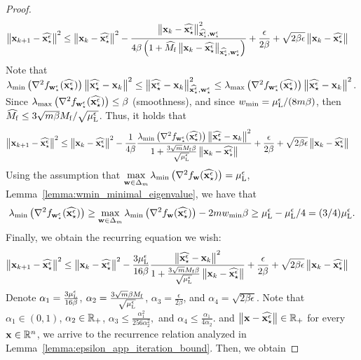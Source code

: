 \begin{proof}
\begin{align*}
    \enorm{\x_{k+1}-\widehat{\xse}}^2 & \leq \enorm{\x_k-\widehat{\xse}}^2 -  \frac{\enorm{\x_k - \widehat{\xse}}_{ \widehat{\xse},\wse}^2}{4\beta \brac{1+\widehat{M_{\mathrm{f}}} \enorm{\x_k-\widehat{\xse}}_{\widehat{\xse}, \wse}}} + \frac{ \epsilon}{2\beta} + \sqrt{2 \beta \epsilon} \enorm{\x_k - \widehat{\xse}}
\end{align*}
Note that $\lambda_{\min} \brac{\nabla^2 f_{\wse}(\widehat{\xse})} \enorm{\widehat{\xse} - \x_k}^2 \leq \enorm{\widehat{\xse} - \x_k}_{\widehat{\xse},\wse}^2 \leq \lambda_{\max} \brac{\nabla^2 f_{\wse}(\widehat{\xse})} \enorm{\widehat{\xse} - \x_k}^2$. Since $\lambda_{\max} \brac{\nabla^2 f_{\wse}(\widehat{\xse})} \leq \beta$ (smoothness), and since $w_{\min}= \mulocaleps /(8m\beta)$, then $\widehat{M_{\mathrm{f}}} \leq 3\sqrt{m\beta}M_{\mathrm{f}} /\sqrt{\mulocaleps}$. Thus, it holds that
\begin{align*}
    \enorm{\x_{k+1}-\widehat{\xse}}^2 &\leq \enorm{\x_k-\widehat{\xse}}^2 -  \frac{1}{4 \beta} \frac{\lambda_{\min}\brac{\nabla^2 f_{\wse}(\widehat{\xse})} \enorm{\widehat{\xse} - \x_k}^2}{1+ \frac{3\sqrt{m} M_{\mathrm{f}} \beta}{\sqrt{\mulocaleps}}  \enorm{\x_k - \widehat{\xse}}} + \frac{ \epsilon}{2\beta} + \sqrt{2 \beta \epsilon} \enorm{\x_k - \widehat{\xse}}
\end{align*}
Using the assumption that $\max\limits_{\w\in \Delta_m}\lambda_{\min}\brac{\nabla^2 f_{\w}(\widehat{\xse})} = \mulocaleps$, Lemma~\ref{lemma:wmin_minimal_eigenvalue}, we have that
\begin{align*}
    \lambda_{\min} \brac{\nabla^2f_{\wse}(\widehat{\xse})}\geq \max\limits_{\w\in \Delta_m}\lambda_{\min}\brac{\nabla^2 f_{\w}(\widehat{\xse})} - 2m\wmin\beta \geq \mulocaleps - \mulocaleps/4 = (3/4)\mulocaleps.
\end{align*}
Finally, we obtain the recurring equation we wish:
\begin{align*}
    \enorm{\x_{k+1}-\widehat{\xse}}^2 &\leq \enorm{\x_k-\widehat{\xse}}^2 -  \frac{3\mulocaleps}{16 \beta} \frac{ \enorm{\widehat{\xse} - \x_k}^2}{1+ \frac{3\sqrt{m} M_{\mathrm{f}} \beta}{\sqrt{\mulocaleps}}  \enorm{\x_k - \widehat{\xse}}} + \frac{ \epsilon}{2\beta} + \sqrt{2 \beta \epsilon} \enorm{\x_k - \widehat{\xse}}
\end{align*}
Denote $\alpha_1 = \frac{3\mulocaleps}{16\beta}$, $\alpha_2 = \frac{3\sqrt{m}\beta M_{\mathrm{f}}}{\sqrt{\mulocaleps }}$, $\alpha_3 = \frac{ \epsilon}{2\beta} $, and $\alpha_4 = \sqrt{2 \beta \epsilon}$. Note that $\alpha_1 \in (0,1)$, $\alpha_2 \in \reals_+$, $\alpha_3 \leq \frac{\alpha_1^2}{256\alpha^2_2},$ and $\alpha_4\leq \frac{\alpha_1}{4\alpha_2}.$ and $\enorm{\x-\widehat{\xse}} \in \reals_+$ for every $\x \in \reals^n$, we arrive to the recurrence relation analyzed in Lemma~\ref{lemma:epsilon_app_iteration_bound}. Then, we obtain

\end{proof}
